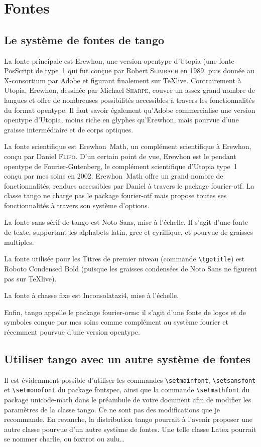 \documentclass[french,ColorTheme=USAF,FontSize=10pt]{tango}
\newcommand\TO[1]{\textsf{#1}}
\begin{document}
\section{Fontes}\label{fnts}

\subsection{Le système de fontes de tango}
La fonte principale est Erewhon, une version opentype d'Utopia (une fonte PosScript de type~1 qui fut conçue par Robert \textsc{Slimbach} en 1989, puis donnée au X-consortium par Adobe et figurant finalement sur TeXlive. Contrairement à Utopia, Erewhon, dessinée par Michael \textsc{Sharpe}, couvre un assez grand nombre de langues et offre de nombreuses possibilités accessibles à travers les fonctionnalités du format opentype. Il faut savoir également qu'Adobe commercialise une version opentype d'Utopia, moins riche en glyphes qu'Erewhon, mais pourvue d'une graisse intermédiaire et de corps optiques. 

La fonte scientifique est Erewhon~Math, un complément scientifique à Erewhon, conçu par Daniel \textsc{Flipo}. D'un certain point de vue, Erewhon est le pendant opentype de Fourier-Gutenberg, le complément scientifique d'Utopia type~1 conçu par mes soins en 2002. Erewhon~Math offre un grand nombre de fonctionnalités, rendues accessibles par Daniel à travers le package \TO{fourier-otf}. La classe tango ne charge pas le package \TO{fourier-otf} mais propose toutes ses fonctionnalités à travers son système d'options.

La fonte sans sérif de tango est Noto Sans, mise à l'échelle. Il s'agit d'une fonte de texte, supportant les alphabets latin, grec et cyrillique, et pourvue de graisses multiples. 

La fonte utilisée pour les Titres de premier niveau (commande \verb=\tgotitle=) est Roboto Condensed Bold (puisque les graisses condensées de Noto Sans ne figurent pas sur TeXlive).

La fonte à chasse fixe est Inconsolatazi4, mise à l'échelle.

Enfin, tango appelle le package fourier-orns: il s'agit d'une fonte de logos et de symboles conçue par mes soins comme complément au système fourier et récemment pourvue d'une version opentype.

\subsection{Utiliser tango avec un autre système de fontes}
Il est évidemment possible d'utiliser les commandes \verb=\setmainfont=, \verb=\setsansfont= et \verb=\setmonofont= du package \TO{fontspec}, ainsi que la commande \verb=\setmathfont= du package \TO{unicode-math} dans le préambule de votre document afin de modifier les paramètres de la classe tango. Ce ne sont pas des modifications que je recommande. En revanche, la distribution tango pourrait à l'avenir proposer une autre classe pourvue d'un autre système de fontes. Une telle classe Latex pourrait se nommer charlie, ou foxtrot ou zulu…
\end{document}
